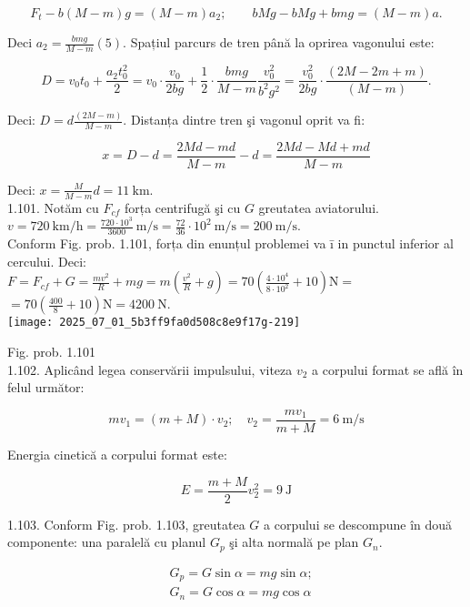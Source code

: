 $$
F_{t}-b(M-m) g=(M-m) a_{2} ; \quad \quad b M g-b M g+b m g=(M-m) a .
$$

Deci $a_{2}=\frac{b m g}{M-m}(5)$. Spațiul parcurs de tren până la oprirea vagonului este:

$$
D=v_{0} t_{0}+\frac{a_{2} t_{0}^{2}}{2}=v_{0} \cdot \frac{v_{0}}{2 b g}+\frac{1}{2} \cdot \frac{b m g}{M-m} \frac{v_{0}^{2}}{b^{2} g^{2}}=\frac{v_{0}^{2}}{2 b g} \cdot \frac{(2 M-2 m+m)}{(M-m)} .
$$

Deci: $D=d \frac{(2 M-m)}{M-m}$. Distanța dintre tren şi vagonul oprit va fi:

$$
x=D-d=\frac{2 M d-m d}{M-m}-d=\frac{2 M d-M d+m d}{M-m}
$$

Deci: $x=\frac{M}{M-m} d=11 \mathrm{~km}$.\\
1.101. Notăm cu $F_{c f}$ forța centrifugă şi cu $G$ greutatea aviatorului.\\
$v=720 \mathrm{~km} / \mathrm{h}=\frac{720 \cdot 10^{3}}{3600} \mathrm{~m} / \mathrm{s}=\frac{72}{36} \cdot 10^{2} \mathrm{~m} / \mathrm{s}=200 \mathrm{~m} / \mathrm{s}$.\\
Conform Fig. prob. 1.101, forța din enunțul problemei va ī in punctul inferior al cercului. Deci:\\
$F=F_{c f}+G=\frac{m v^{2}}{R}+m g=m\left(\frac{v^{2}}{R}+g\right)=70\left(\frac{4 \cdot 10^{4}}{8 \cdot 10^{2}}+10\right) \mathrm{N}=$ $=70\left(\frac{400}{8}+10\right) \mathrm{N}=4200 \mathrm{~N}$.\\
\texttt{[image: 2025\_07\_01\_5b3ff9fa0d508c8e9f17g-219]}

Fig. prob. 1.101\\
1.102. Aplicând legea conservării impulsului, viteza $v_{2}$ a corpului format se află în felul următor:

$$
m v_{1}=(m+M) \cdot v_{2} ; \quad v_{2}=\frac{m v_{1}}{m+M}=6 \mathrm{~m} / \mathrm{s}
$$

Energia cinetică a corpului format este:

$$
E=\frac{m+M}{2} v_{2}^{2}=9 \mathrm{~J}
$$

1.103. Conform Fig. prob. 1.103, greutatea $G$ a corpului se descompune în două componente: una paralelă cu planul $G_{p}$ şi alta normală pe plan $G_{n}$.

$$
\begin{aligned}
& G_{p}=G \sin \alpha=m g \sin \alpha ; \\
& G_{n}=G \cos \alpha=m g \cos \alpha
\end{aligned}
$$

